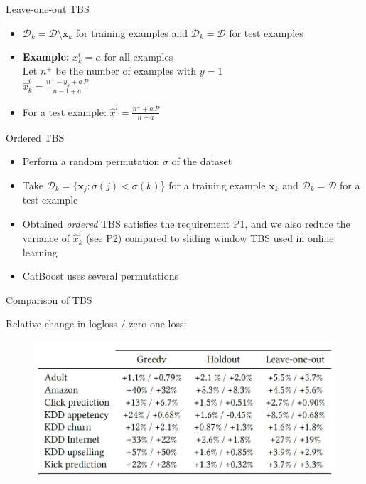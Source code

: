 \documentclass[pdf, 12pt, unicode]{beamer}
\newcommand{\x}{\mathbf{x}}
\newcommand{\D}{\mathcal{D}}
\newcommand{\1}{\mathbbm{1}}
\begin{document}
\begin{frame}{Leave-one-out TBS} 

\begin{itemize}
\item $\D_k = \D \setminus \x_k$ for training examples and $\D_k = \D$ for test examples
\pause
\item \textbf{Example:} $x_k^i = a$ for all examples \\
Let $n^+$ be the number of examples with $y=1$ \\ 
$\hat x_{k}^{i} = \frac{n^+ - y_k + a\,P}{n - 1 + a}$\\
\pause
\item For a test example: $\hat x^{i} = \frac{n^+ + a\,P}{n + a}$ 
\end{itemize}

\end{frame}



\begin{frame}{Ordered TBS}

\begin{itemize}
\item Perform a random permutation $\sigma$ of the dataset
\item Take $\D_k = \{\x_j:\sigma(j)<\sigma(k)$\} for a training example $\x_k$ and $\D_k = \D$ for a test example
\pause
\item Obtained \textit{ordered} TBS satisfies the requirement P1, and we also reduce the variance of $\hat x^i_k$ (see P2) compared to sliding window TBS used in online learning
\item CatBoost uses several permutations
\end{itemize}
\end{frame}


\begin{frame}{Comparison of TBS}

Relative change in logloss / zero-one loss:

\begin{figure}
	\centering
	\includegraphics[width=\textwidth]{tbs.png}
\end{figure}


\end{frame}
\end{document}
